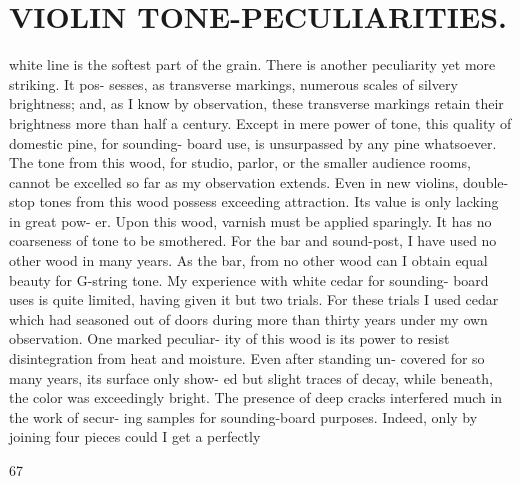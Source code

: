 \documentclass{article}
\begin{document}
\section*{VIOLIN TONE-PECULIARITIES.}
white line is the softest part of the grain. There is another peculiarity yet more striking. It pos- sesses, as transverse markings, numerous scales of silvery brightness; and, as I know by observation, these transverse markings retain their brightness more than half a century. Except in mere power of tone, this quality of domestic pine, for sounding- board use, is unsurpassed by any pine whatsoever. The tone from this wood, for studio, parlor, or the smaller audience rooms, cannot be excelled so far as my observation extends. Even in new violins, double-stop tones from this wood possess exceeding attraction. Its value is only lacking in great pow- er. Upon this wood, varnish must be applied sparingly. It has no coarseness of tone to be smothered. For the bar and sound-post, I have used no other wood in many years. As the bar, from no other wood can I obtain equal beauty for G-string tone. My experience with white cedar for sounding- board uses is quite limited, having given it but two trials. For these trials I used cedar which had seasoned out of doors during more than thirty years under my own observation. One marked peculiar- ity of this wood is its power to resist disintegration from heat and moisture. Even after standing un- covered for so many years, its surface only show- ed but slight traces of decay, while beneath, the color was exceedingly bright. The presence of deep cracks interfered much in the work of secur- ing samples for sounding-board purposes. Indeed, only by joining four pieces could I get a perfectly

67
\end{document}
